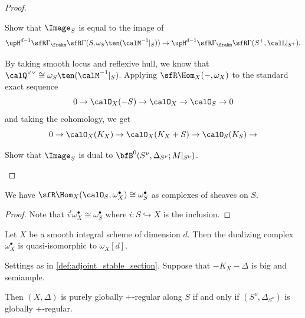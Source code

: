 \begin{proof}
        \begin{step}
            Show that \(\Image_S\) is equal to the image of 
            \[ \upH^{d-1}\sfR\Gamma_\frakm\sfR\Gamma(S,\omega_S\ten (\calM^{-1}|_S)) \to \upH^{d-1}\sfR\Gamma_\frakm\sfR\Gamma(S^+,\calL|_{S^+}). \]
        \end{step}
        \begin{subproof}
            By taking smooth locus and reflexive hull, we know that \(\calQ^{\vee\vee} \cong \omega_S \ten (\calM^{-1}|_S)\).
            Applying \(\sfR\Hom_X(-,\omega_X)\) to the standard exact sequence 
            \[ 0 \to \calO_X(-S) \to \calO_X \to \calO_S \to 0 \]
            and taking the cohomology, we get 
            \[ 0 \to \calO_X(K_X) \to \calO_X(K_X+S) \to \calO_S(K_S) \to \]
        \end{subproof}

        \begin{step}
            Show that \(\Image_S\) is dual to \(\bfB^0(S^\nu,\Delta_{S^\nu};M|_{S^\nu})\).
        \end{step}

    \end{proof}

    \begin{lemma}\label{lem:derived_and_dualing_sheaf}
        We have \(\sfR\Hom_X(\calO_S,\omega_X^{\bullet}) \cong \omega_S^{\bullet}\) as complexes of sheaves on \(S\).
    \end{lemma}
    \begin{proof}
        Note that \(i^!\omega_X^\bullet \cong \omega_S^\bullet\) where \(i: S \hookrightarrow X\) is the inclusion.
    \end{proof}

    \begin{proposition}\label{prop:dualing_complex_smooth_case}
        Let \(X\) be a smooth integral scheme of dimension \(d\).
        Then the dualizing complex \(\omega_X^\bullet\) is quasi-isomorphic to \(\omega_X[d]\).
    \end{proposition}

    \begin{proposition}\label{prop:adjunction_inversion}
        Settings as in \cref{def:adjoint_stable_section}.
        Suppose that \(-K_X-\Delta\) is big and semiample.

        Then \((X,\Delta)\) is purely globally +-regular along \(S\) if and only if \((S^\nu,\Delta_{S^\nu})\) is globally +-regular.
    \end{proposition}


